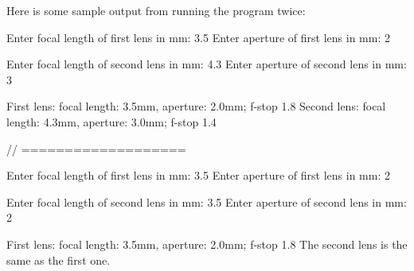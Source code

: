 \begin{exercise}
Here is some sample output from running the program twice:

\begin{stdout}
Enter focal length of first lens in mm: 3.5
Enter aperture of first lens in mm: 2

Enter focal length of second lens in mm: 4.3
Enter aperture of second lens in mm: 3

First lens: focal length: 3.5mm, aperture: 2.0mm; f-stop 1.8
Second lens: focal length: 4.3mm, aperture: 3.0mm; f-stop 1.4

// ===================

Enter focal length of first lens in mm: 3.5
Enter aperture of first lens in mm: 2

Enter focal length of second lens in mm: 3.5
Enter aperture of second lens in mm: 2

First lens: focal length: 3.5mm, aperture: 2.0mm; f-stop 1.8
The second lens is the same as the first one.
\end{stdout}

\end{exercise}

